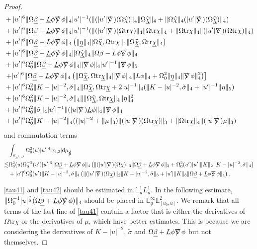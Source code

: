 \documentclass[11pt,reqno]{amsart}
\theoremstyle{definition}
\numberwithin{equation}{section}
\newcommand{\D}{\mathrm{d}}
\newcommand{\tr}{\mathrm{tr}}
\renewcommand{\L}{\mathbb{L}}
\def\betab{\underline{\beta}}
\def\chib{\underline{\chi}}
\def\chibh{\widehat{\underline{\chi}}}
\def\chih{\widehat{\chi}}
\def\etab{\underline{\eta}}
\def\Lb{\underline{L}}
\def\tr{\mathrm{tr}}
\def\sigmac{\check{\sigma}}
\def\ub{\underline{u}}
\def\nablas{\mbox{$\nabla \mkern -13mu /$ }}
\def\gs{\mbox{$g \mkern -9mu /$}}
\begin{document}
\begin{proof}
\begin{equation}
\begin{split}
&+|u'|^6\|\Omega\betab+\Lb\phi\nablas\phi\|_4|u'|^{-1}(\|(|u'|\nablas)(\Omega\chih)\|_4\|\Omega\chibh\|_4+\|\Omega\chih\|_4(|u'|\nablas)(\Omega\chibh)\|_4)\\
&+|u'|^6\|\Omega\betab+\Lb\phi\nablas\phi\|_4|u'|^{-1}(\|(|u'|\nablas)(\Omega\tr\chi)\|_4\|\Omega\tr\chib\|_4+\|\Omega\tr\chi\|_4\|(|u'|\nablas)(\Omega\tr\chib)\|_4)\\
&+|u'|^6\|\Omega\betab+\Lb\phi\nablas\phi\|_4\left(\|\etab\|_4\|\Omega\chih,\Omega\tr\chi\|_4\|\Omega\chibh,\Omega\tr\chib\|_4\right)\\
&+|u'|^6\|\Omega\betab+\Lb\phi\nablas\phi\|_4\|\Omega\chibh\|_4\|\Omega\beta-L\phi\nablas\phi\|_4\\
&+|u'|^6\Omega_0^2\|\Omega\betab+\Lb\phi\nablas\phi\|_4\|\nablas\phi\|_4|u'|^{-1}\|\nablas\phi\|_5\\
&\left.+|u'|^6\|\Omega\betab+\Lb\phi\nablas\phi\|_4\left(\|\Omega\chibh,\Omega\tr\chib\|_4\|\nablas\phi\|_4\|L\phi\|_4+\Omega_0^2\|\etab\|_4\|\nablas\phi\|_4^2\right)\right]\\
&+|u'|^6\Omega_0^2\|K-|u|^{-2},\sigmac\|_4\|\Omega\chibh, \Omega\tr\chib+2|u|^{-1}\|_4(\|K-|u|^{-2},\sigmac\|_4+|u'|^{-1}\|\eta\|_5)\\
&+|u'|^6\Omega_0^2\|K-|u|^{-2},\sigmac\|_4\|\|\Omega\chibh,\Omega\tr\chib\|_4\|\eta\|_4^2\\
&+|u'|^6\Omega_0^2\|\sigmac\|_4|u'|^{-1}\|(|u|\nablas)\Lb\phi\|_4\|\nablas\phi\|_4\\
&+|u'|^6\Omega_0^2\|K-|u|^{-2}\|_4((|u|^{-2}+\|\mu\|_3)\|(|u|\nablas)(\Omega\tr\chib)\|_3+\|\Omega\tr\chib\|_4\|(|u|\nablas)\mu\|_3)
\end{split}
\end{equation}
and commutation terms
\begin{equation}\label{tau42}
\begin{split}
&\int_{S_{\ub',u'}}\Omega_0^2(u)|u'|^4|\tau_{4,2}|\D\mu_{\gs}\\
\lesssim&\Omega_0^2(u)\Omega_0^{-2}(u')|u'|^6\|\Omega\betab+\Lb\phi\nablas\phi\|_4\left(\|(|u'|\nablas)(\Omega\chi)\|_3\|\Omega\betab+\Lb\phi\nablas\phi\|_3+\Omega_0^2(u')|u'|\|K\|_2\|K-|u|^{-2},\sigmac\|_4\right)\\
&+|u'|^6\Omega_0^2(u')\|K-|u|^{-2},\sigmac\|_4\left(\|(|u'|\nablas)(\Omega\chib)\|_2\|K-|u|^{-2},\sigmac\|_3+|u'|\|K\|_3\|\Omega\betab+\Lb\phi\nablas\phi\|_4\right).
\end{split}
\end{equation}

\eqref{tau41} and \eqref{tau42} should be estimated in $\L_{\ub}^1L^1_u$. In the following estimate, $\|\Omega_0^{-1}|u|^{\frac{7}{2}}(\Omega\betab+\Lb\phi\nablas\phi)\|_4$ should be placed in $\L^\infty_{\ub}\L^2_{[u_0,u]}$. We remark that all terms of the last line of \eqref{tau41} contain a factor that is either the derivatives of $\Omega\tr\chib$ or the derivatives of $\mu$, which have better estimates. This is because we are considering the derivatives of $K-|u|^{-2}$, $\sigmac$ and $\Omega\betab+\Lb\phi\nablas\phi$ but not themselves.


\end{proof}
\end{document}
